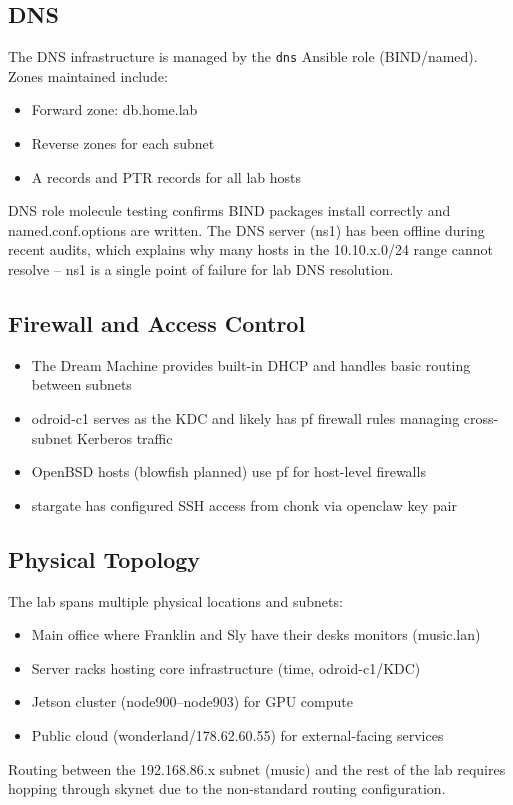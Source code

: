 \subsection{DNS}

The DNS infrastructure is managed by the \texttt{dns} Ansible role (BIND/named). Zones maintained include:
\begin{itemize}
    \item Forward zone: db.home.lab
    \item Reverse zones for each subnet
    \item A records and PTR records for all lab hosts
\end{itemize}

DNS role molecule testing confirms BIND packages install correctly and named.conf.options are written. The DNS server (ns1) has been offline during recent audits, which explains why many hosts in the 10.10.x.0/24 range cannot resolve -- ns1 is a single point of failure for lab DNS resolution.

\subsection{Firewall and Access Control}

\begin{itemize}
    \item The Dream Machine provides built-in DHCP and handles basic routing between subnets
    \item odroid-c1 serves as the KDC and likely has pf firewall rules managing cross-subnet Kerberos traffic
    \item OpenBSD hosts (blowfish planned) use pf for host-level firewalls
    \item stargate has configured SSH access from chonk via openclaw key pair
\end{itemize}

\subsection{Physical Topology}

The lab spans multiple physical locations and subnets:
\begin{itemize}
    \item Main office where Franklin and Sly have their desks monitors (music.lan)
    \item Server racks hosting core infrastructure (time, odroid-c1/KDC)
    \item Jetson cluster (node900--node903) for GPU compute
    \item Public cloud (wonderland/178.62.60.55) for external-facing services
\end{itemize}

Routing between the 192.168.86.x subnet (music) and the rest of the lab requires hopping through skynet due to the non-standard routing configuration.
